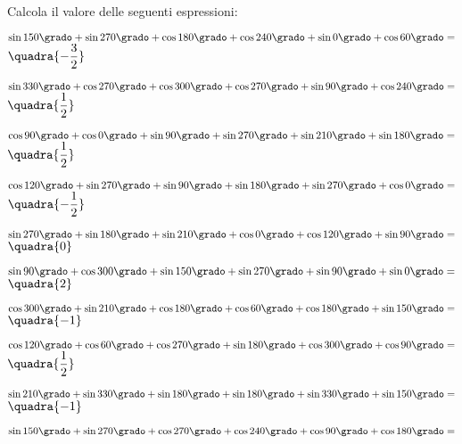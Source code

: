 \begin{esercizio}\label{ese:}
 Calcola il valore delle seguenti espressioni:
 \begin{enumeratea}
  \item  $\sin 150 \grado+ \sin 270 \grado+ \cos 180 \grado+ 
          \cos 240 \grado+ \sin 0 \grado+ \cos 60 \grado= $
   \hfill $\quadra{-\dfrac{3}{2}}$
  \item  $\sin 330 \grado+ \cos 270 \grado+ \cos 300 \grado+ 
          \cos 270 \grado+ \sin 90 \grado+ \cos 240 \grado= $
   \hfill $\quadra{\dfrac{1}{2}}$
  \item  $\cos 90 \grado + \cos 0 \grado + \sin 90 \grado + 
          \sin 270 \grado + \sin 210 \grado + \sin 180 \grado = $
   \hfill $\quadra{\dfrac{1}{2}}$
  \item  $\cos 120 \grado + \sin 270 \grado + \sin 90 \grado + 
          \sin 180 \grado + \sin 270 \grado + \cos 0 \grado = $
   \hfill $\quadra{-\dfrac{1}{2}}$
  \item  $\sin 270 \grado + \sin 180 \grado + \sin 210 \grado + 
          \cos 0 \grado + \cos 120 \grado + \sin 90 \grado = $
   \hfill $\quadra{0}$
  \item  $\sin 90 \grado + \cos 300 \grado + \sin 150 \grado + 
          \sin 270 \grado + \sin 90 \grado + \sin 0 \grado = $
   \hfill $\quadra{2}$
  \item  $\cos 300 \grado + \sin 210 \grado + \cos 180 \grado + 
          \cos 60 \grado + \cos 180 \grado + \sin 150 \grado = $
   \hfill $\quadra{-1}$
  \item  $\cos 120 \grado + \cos 60 \grado + \cos 270 \grado + 
          \sin 180 \grado + \cos 300 \grado + \cos 90 \grado = $
   \hfill $\quadra{\dfrac{1}{2}}$
  \item  $\sin 210 \grado + \sin 330 \grado + \sin 180 \grado + 
          \sin 180 \grado + \sin 330 \grado + \sin 150 \grado = $
   \hfill $\quadra{-1}$
  \item  $\sin 150 \grado + \sin 270 \grado + \cos 270 \grado + 
          \cos 240 \grado + \cos 90 \grado + \cos 180 \grado = $

\end{enumeratea}
\end{esercizio}

